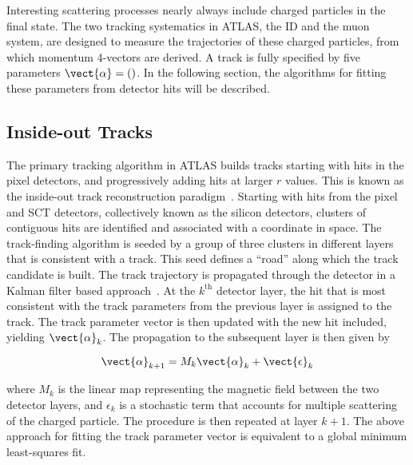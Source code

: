 
Interesting scattering processes nearly always include charged
particles in the final state. The two tracking systematics in ATLAS, the ID and the muon
system, are designed to measure the trajectories of these charged
particles, from which momentum 4-vectors are derived. A track is fully
specified by five parameters $\vect{\alpha} = ()$. In the following section,
the algorithms for fitting these parameters from detector hits will be
described. 

\subsection{Inside-out Tracks}

The primary tracking algorithm in ATLAS builds tracks starting with
hits in the pixel detectors, and progressively adding hits at larger
$r$ values. This is known as the inside-out track reconstruction
paradigm~\cite{bib:Cornelissen:2007vba}. Starting with hits from the pixel and SCT detectors,
collectively known as the silicon detectors, clusters of contiguous
hits are identified and associated with a coordinate in space. The
track-finding algorithm is seeded by a group of three clusters in
different layers that is consistent with a track. This seed defines a
``road'' along which the track candidate is built. The track
trajectory is propagated through the detector in a Kalman filter based
approach~\cite{bib:Fruhwirth:1987fm}. At the $k^{\textrm{th}}$ detector layer, the hit
that is most consistent with the track parameters from the previous
layer is assigned to the track. The track parameter vector is then
updated with the new hit included, yielding $\vect{\alpha}_k$. The propagation to the subsequent
layer is then given by

\begin{equation}
\vect{\alpha}_{k+1} = M_k\vect{\alpha}_{k} + \vect{\epsilon}_{k}
\end{equation}

\noindent
where $M_k$ is the linear map representing the magnetic field between the
two detector layers, and $\epsilon_{k}$ is a stochastic term that
accounts for multiple scattering of the charged particle. The
procedure is then repeated at layer $k+1$. The above approach for
fitting the track parameter vector is equivalent to a global minimum
least-squares fit. 

